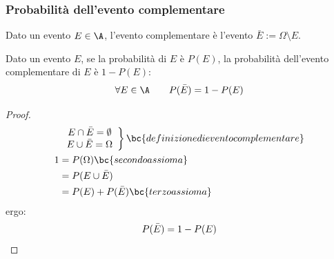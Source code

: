 \subsubsection{Probabilità dell'evento complementare}
\begin{defin}
	Dato un evento $E\in\A$, l'evento complementare è l'evento $\bar E := \Omega\setminus E$.
\end{defin}
\begin{teor} \label{t:probcompl}
	Dato un evento $E$, se la probabilità di $E$ è $P(E)$, la probabilità dell'evento complementare di $E$ è $1-P(E)$:
	\begin{equation*}
		\forall E\in\A\qquad P(\bar E)=1-P(E)
	\end{equation*}
\end{teor}
\begin{proof}
	\begin{align*}
		  & \left.
		\begin{array}{cc}
			E\cap\bar E=\emptyset \\
			E\cup\bar E=\Omega
		\end{array} \right\}  \bc{definizione di evento complementare} \\
		1 & = P(\Omega)        \bc{secondo assioma}                                  \\
		  & = P(E\cup\bar E)                                                         \\
		  & = P(E)+P(\bar E)   \bc{terzo assioma}
	\end{align*}
	ergo:
	\begin{equation*}
		P(\bar E)=1-P(E) \qedhere
	\end{equation*}
\end{proof}

